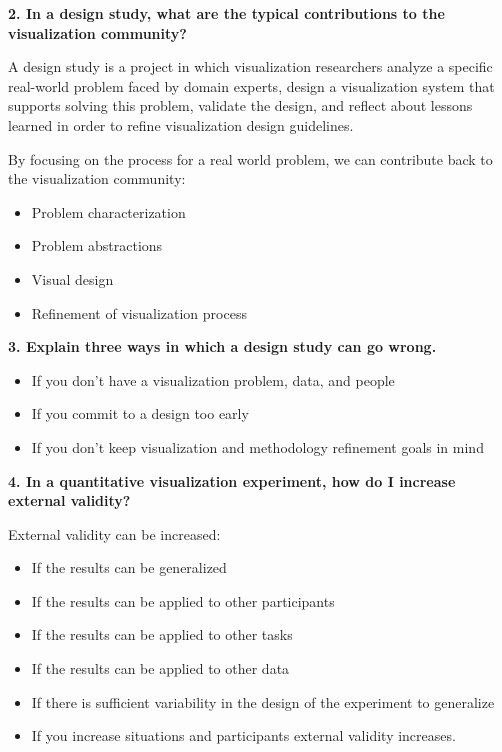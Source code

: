 \documentclass{article}[12pt]
\begin{document}
\vspace{2ex}\noindent
{\bf 2. In a design study, what are the typical contributions to the visualization community?}

{
	A design study is a project in which visualization researchers analyze a specific real-world problem faced by domain experts, design a visualization system that supports solving this problem, validate the design, and reflect about lessons learned in order to refine visualization design guidelines.

	By focusing on the process for a real world problem, we can contribute back to the visualization community:
	\begin{itemize}
    \item Problem characterization
    \item Problem abstractions
    \item Visual design
    \item Refinement of visualization process
    \end{itemize}
}




\vspace{2ex}\noindent
{\bf 3. Explain three ways in which a design study can go wrong. }

{ 
    \begin{itemize}
    \item   If you don't have a visualization problem, data, and people
	\item   If you commit to a design too early
    \item	If you don't keep visualization and methodology refinement goals in mind
    \end{itemize}
}




\vspace{2ex}\noindent
{ \bf 4. In a quantitative visualization experiment, how do I increase external validity? }

{
	External validity can be increased:
	\begin{itemize}
	\item   If the results can be generalized
	\item   If the results can be applied to other participants
	\item   If the results can be applied to other tasks
	\item   If the results can be applied to other data
	\item   If there is sufficient variability in the design of the experiment to generalize
	\item  If you increase situations and participants external validity increases.
    \end{itemize}
}
\end{document}
